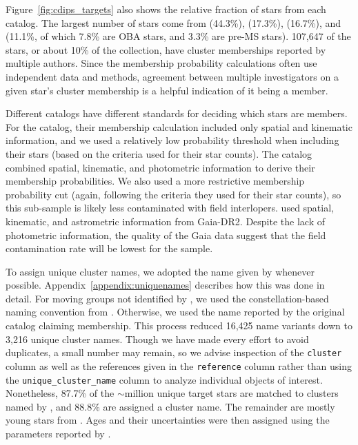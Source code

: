 \documentclass[12pt,twocolumn,tighten,trackchanges]{aastex62}
\begin{document}
Figure~\ref{fig:cdips_targets} also shows the relative fraction of
stars from each catalog.  The largest number of stars come from
\citealt{dias_proper_2014} (44.3\%), \citealt{Kharchenko_et_al_2013}
(17.3\%), \citealt{cantat-gaudin_gaia_2018} (16.7\%), and
\citealt{zari_3d_2018} (11.1\%, of which 7.8\% are OBA stars, and
3.3\% are pre-MS stars).  107{,}647 of the stars, or about 10\% of the
collection, have cluster memberships reported by multiple authors.
Since the membership probability calculations often use independent
data and methods, agreement between multiple investigators on a given
star's cluster membership is a helpful indication of it being a
member.

Different catalogs have different standards for deciding which stars
are members.  For the \citet{dias_proper_2014} catalog, their
membership calculation included only spatial and kinematic
information, and we used a relatively low probability threshold when
including their stars (based on the criteria
\citealt{dias_proper_2014} used for their star counts).  The
\citet{Kharchenko_et_al_2013} catalog combined spatial, kinematic, and
photometric information to derive their membership probabilities.  We
also used a more restrictive membership probability cut (again,
following the criteria they used for their star counts), so this
sub-sample is likely less contaminated with field interlopers.
\citet{cantat-gaudin_gaia_2018} used spatial, kinematic, and
astrometric information from Gaia-DR2. Despite the lack of photometric
information, the quality of the Gaia data suggest that the field
contamination rate will be lowest for the
\citet{cantat-gaudin_gaia_2018} sample.

To assign unique cluster names, we adopted the name given by
\citet{Kharchenko_et_al_2013} whenever possible.
Appendix~\ref{appendix:uniquenames} describes  how this was done in
detail.  For moving groups not identified by
\citet{Kharchenko_et_al_2013}, we used the constellation-based naming
convention from \citet{gagne_banyan_XI_2018}.  Otherwise, we used the
name reported by the original catalog claiming membership.  This
process reduced 16,425 name variants down to 3,216 unique cluster
names.  Though we have made every effort to avoid duplicates, a small
number may remain, so we advise inspection of the \texttt{cluster}
column as well as the references given in the \texttt{reference}
column rather than using the \texttt{unique\_cluster\_name} column to
analyze individual objects of interest.  Nonetheless, 87.7\% of the
$\sim$million unique target stars are matched to clusters named by
\citet{Kharchenko_et_al_2013}, and 88.8\% are assigned a cluster name.
The remainder are mostly young stars from \citet{zari_3d_2018}.
Ages and their uncertainties were then assigned using the parameters
reported by \citet{Kharchenko_et_al_2013}.
\end{document}
